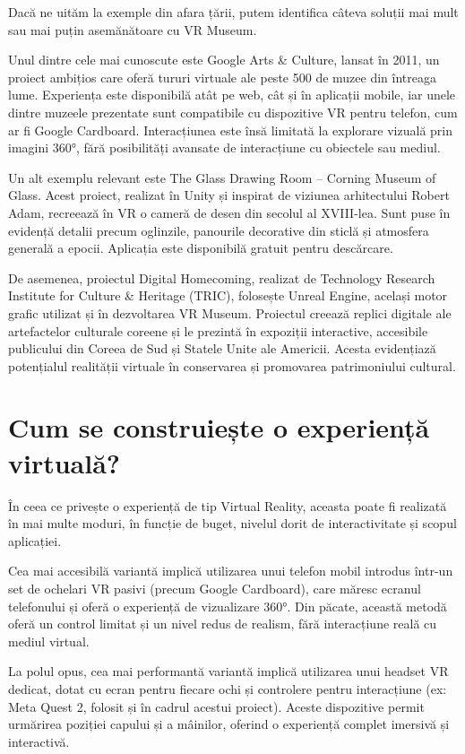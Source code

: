 Dacă ne uităm la exemple din afara țării, putem identifica câteva soluții mai mult sau mai puțin asemănătoare cu VR Museum.

Unul dintre cele mai cunoscute este Google Arts \& Culture, lansat în 2011, un proiect ambițios care oferă tururi virtuale ale peste 500 de muzee din întreaga lume. Experiența este disponibilă atât pe web, cât și în aplicații mobile, iar unele dintre muzeele prezentate sunt compatibile cu dispozitive VR pentru telefon, cum ar fi Google Cardboard. Interacțiunea este însă limitată la explorare vizuală prin imagini 360°, fără posibilități avansate de interacțiune cu obiectele sau mediul.

Un alt exemplu relevant este The Glass Drawing Room – Corning Museum of Glass. Acest proiect, realizat în Unity și inspirat de viziunea arhitectului Robert Adam, recreează în VR o cameră de desen din secolul al XVIII-lea. Sunt puse în evidență detalii precum oglinzile, panourile decorative din sticlă și atmosfera generală a epocii. Aplicația este disponibilă gratuit pentru descărcare.

De asemenea, proiectul Digital Homecoming, realizat de Technology Research Institute for Culture \& Heritage (TRIC), folosește Unreal Engine, același motor grafic utilizat și în dezvoltarea VR Museum. Proiectul creează replici digitale ale artefactelor culturale coreene și le prezintă în expoziții interactive, accesibile publicului din Coreea de Sud și Statele Unite ale Americii. Acesta evidențiază potențialul realității virtuale în conservarea și promovarea patrimoniului cultural.

\section{Cum se construiește o experiență virtuală?}

În ceea ce privește o experiență de tip Virtual Reality, aceasta poate fi realizată în mai multe moduri, în funcție de buget, nivelul dorit de interactivitate și scopul aplicației.

Cea mai accesibilă variantă implică utilizarea unui telefon mobil introdus într-un set de ochelari VR pasivi (precum Google Cardboard), care măresc ecranul telefonului și oferă o experiență de vizualizare 360°. Din păcate, această metodă oferă un control limitat și un nivel redus de realism, fără interacțiune reală cu mediul virtual.

La polul opus, cea mai performantă variantă implică utilizarea unui headset VR dedicat, dotat cu ecran pentru fiecare ochi și controlere pentru interacțiune (ex: Meta Quest 2, folosit și în cadrul acestui proiect). Aceste dispozitive permit urmărirea poziției capului și a mâinilor, oferind o experiență complet imersivă și interactivă.


